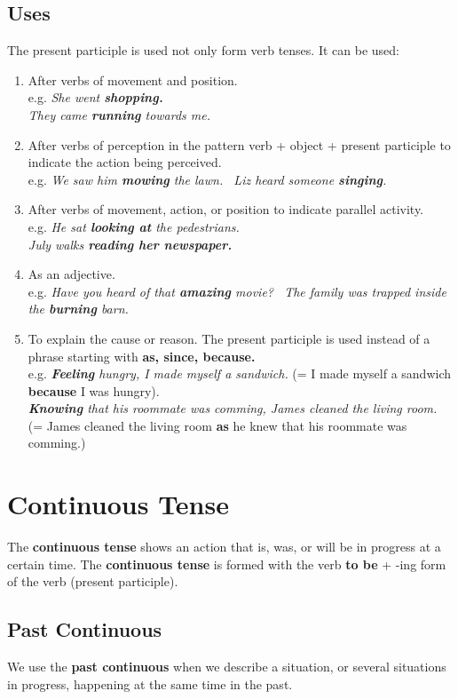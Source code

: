 \documentclass[hidelinks,10pt,a4paper]{article}
\begin{document}
\subsection{Uses}
The present participle is used not only form verb tenses. It can be used:
\begin{enumerate}[label=(\alph*)]
	\item After verbs of movement and position. \\
		e.g. \textit{ She went \textbf{shopping. \\
			} They came \textbf{running} towards me. }
	\item After verbs of perception in the pattern verb + object + present participle to indicate the action being perceived. \\
		e.g. \textit{We saw him \textbf{mowing} the lawn. \
		Liz heard someone \textbf{singing}.}
	\item After verbs of movement, action, or position to indicate parallel activity. \\
		e.g. \textit{He sat \textbf{looking at} the pedestrians. \\
		July walks \textbf{reading her newspaper.} }
	\item As an adjective. \\
		e.g. \textit{Have you heard of that \textbf{amazing} movie? \
		The family was trapped inside the \textbf{burning} barn.}
	\item To explain the cause or reason. The present participle is used instead of a phrase starting with \textbf{as, since, because.} \\
		e.g. \textit{ \textbf{Feeling} hungry, I made myself a sandwich.} (= I made myself a sandwich \textbf{because} I was hungry). \\
		\textit{ \textbf{Knowing} that his roommate was comming, James cleaned the living room.} (= James cleaned the living room \textbf{as} he knew that his roommate was comming.)
\end{enumerate}


\section{Continuous Tense}
The \textbf{continuous tense} shows an action that is, was, or will be in progress at a certain time. The \textbf{continuous tense} is formed with the verb \textbf{to be} + -ing form of the verb (present participle).

\subsection{Past Continuous}
We use the \textbf{past continuous} when we describe a situation, or several situations in progress, happening at the same time in the past.
\end{document}
